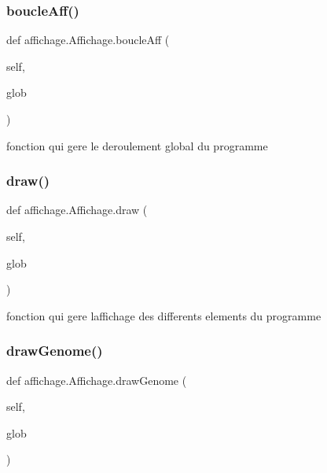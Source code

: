 \subsubsection{\texorpdfstring{boucle\+Aff()}{boucleAff()}}
{\footnotesize\ttfamily def affichage.\+Affichage.\+boucle\+Aff (\begin{DoxyParamCaption}\item[{}]{self,  }\item[{}]{glob }\end{DoxyParamCaption})}



fonction qui gere le deroulement global du programme 

\mbox{\label{classaffichage_1_1_affichage_a647ba807e5b1382a57620a50260ffd3e}} 
\subsubsection{\texorpdfstring{draw()}{draw()}}
{\footnotesize\ttfamily def affichage.\+Affichage.\+draw (\begin{DoxyParamCaption}\item[{}]{self,  }\item[{}]{glob }\end{DoxyParamCaption})}



fonction qui gere l\textquotesingle{}affichage des differents elements du programme 

\mbox{\label{classaffichage_1_1_affichage_a7ab0f7572f9af4ebcd005f631d6e1845}} 
\subsubsection{\texorpdfstring{draw\+Genome()}{drawGenome()}}
{\footnotesize\ttfamily def affichage.\+Affichage.\+draw\+Genome (\begin{DoxyParamCaption}\item[{}]{self,  }\item[{}]{glob }\end{DoxyParamCaption})}



